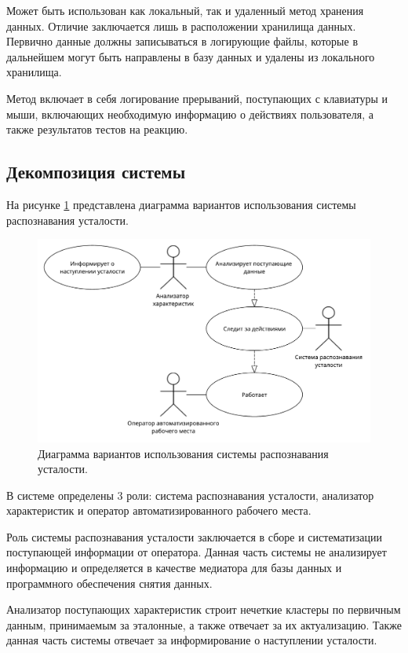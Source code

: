 Может быть использован как локальный, так и удаленный метод хранения данных. Отличие заключается лишь в расположении хранилища данных. Первично данные должны записываться в логирующие файлы, которые в дальнейшем могут быть направлены в базу данных и удалены из локального хранилища.

Метод включает в себя логирование прерываний, поступающих с клавиатуры и мыши, включающих необходимую информацию о действиях пользователя, а также результатов тестов на реакцию.

\subsection{Декомпозиция системы}
На рисунке \ref{fig:useCase} представлена диаграмма вариантов использования системы распознавания усталости.
\begin{figure}[H]
	\centering
	\includegraphics[width=\textwidth]{img/useCaseDiagram.pdf}
	\caption{Диаграмма вариантов использования системы распознавания усталости.}
	\label{fig:useCase}
\end{figure}

В системе определены 3 роли: система распознавания усталости, анализатор характеристик и оператор автоматизированного рабочего места.

Роль системы распознавания усталости заключается в сборе и систематизации поступающей информации от оператора. Данная часть системы не анализирует информацию и определяется в качестве медиатора для базы данных и программного обеспечения снятия данных.

Анализатор поступающих характеристик строит нечеткие кластеры по первичным данным, принимаемым за эталонные, а также отвечает за их актуализацию. Также данная часть системы отвечает за информирование о наступлении усталости.

